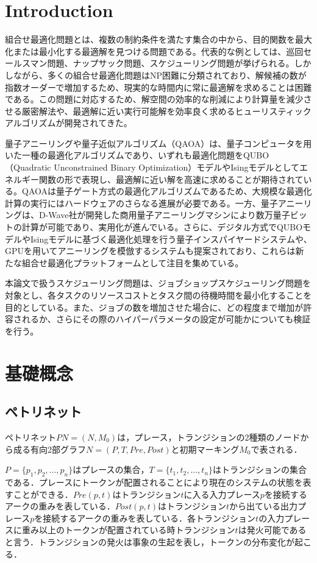 \documentclass[conference]{IEEEtran}
\begin{document}
\section{Introduction}
組合せ最適化問題とは、複数の制約条件を満たす集合の中から、目的関数を最大化または最小化する最適解を見つける問題である。代表的な例としては、巡回セールスマン問題、ナップサック問題、スケジューリング問題が挙げられる。しかしながら、多くの組合せ最適化問題はNP困難に分類されており、解候補の数が指数オーダーで増加するため、現実的な時間内に常に最適解を求めることは困難である。この問題に対応するため、解空間の効率的な削減により計算量を減少させる厳密解法や、最適解に近い実行可能解を効率良く求めるヒューリスティックアルゴリズムが開発されてきた。

量子アニーリングや量子近似アルゴリズム（QAOA）は、量子コンピュータを用いた一種の最適化アルゴリズムであり、いずれも最適化問題をQUBO（Quadratic Unconstrained Binary Optimization）モデルやIsingモデルとしてエネルギー関数の形で表現し、最適解に近い解を高速に求めることが期待されている。QAOAは量子ゲート方式の最適化アルゴリズムであるため、大規模な最適化計算の実行にはハードウェアのさらなる進展が必要である。一方、量子アニーリングは、D-Wave社が開発した商用量子アニーリングマシンにより数万量子ビットの計算が可能であり、実用化が進んでいる。さらに、デジタル方式でQUBOモデルやIsingモデルに基づく最適化処理を行う量子インスパイヤードシステムや、GPUを用いてアニーリングを模倣するシステムも提案されており、これらは新たな組合せ最適化プラットフォームとして注目を集めている。

本論文で扱うスケジューリング問題は、ジョブショップスケジューリング問題を対象とし、各タスクのリソースコストとタスク間の待機時間を最小化することを目的としている。また、ジョブの数を増加させた場合に、どの程度まで増加が許容されるか、さらにその際のハイパーパラメータの設定が可能かについても検証を行う。

\section{基礎概念}

\subsection{ペトリネット}
ペトリネット$PN = (N,M_0)$は，プレース，トランジションの2種類のノードから成る有向2部グラフ$N = (P,T,Pre,Post)$と初期マーキング$M_0$で表される．\cite{b1}

$P = \{p_1,p_2,...,p_n\}$はプレースの集合，$T = \{t_1,t_2,...,t_n\}$はトランジションの集合である．プレースにトークンが配置されることにより現在のシステムの状態を表すことができる．$Pre(p,t)$はトランジション$t$に入る入力プレース$p$を接続するアークの重みを表している．$Post(p,t)$はトランジション$t$から出ている出力プレース$p$を接続するアークの重みを表している．各トランジション$t$の入力プレースに重み以上のトークンが配置されている時トランジション$t$は発火可能であると言う．トランジションの発火は事象の生起を表し，トークンの分布変化が起こる．
\end{document}
